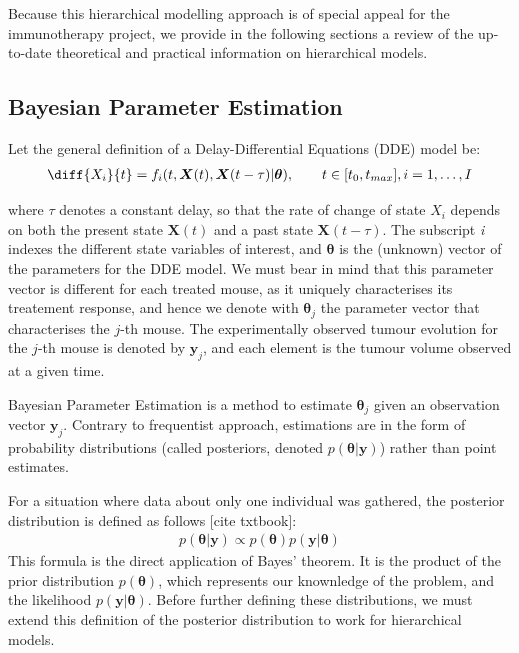 \documentclass[11pt]{article}
\begin{document}
Because this hierarchical modelling approach is of special appeal for the immunotherapy project, we provide in the following sections a review of the up-to-date theoretical and practical information on hierarchical models.

\subsection{Bayesian Parameter Estimation}
Let the general definition of a Delay-Differential Equations (DDE) model be: 
\begin{align*}
    \diff{X_i}{t} = f_i(t, \boldsymbol{X}(t), \boldsymbol{X}(t-\tau)| \boldsymbol{\theta}), \qquad t \in [t_0, t_{max}], i = 1, \ldots, I
\end{align*}

where $\tau$ denotes a constant delay, so that the rate of change of state $X_i$ depends on both the present state $\boldsymbol{X}(t)$ and a past state $\boldsymbol{X}(t-\tau)$. The subscript \textit{i} indexes the different state variables of interest, and $\boldsymbol{\theta}$ is the (unknown) vector of the parameters for the DDE model. We must bear in mind that this parameter vector is different for each treated mouse, as it uniquely characterises its treatement response, and hence we denote with $\boldsymbol{\theta}_j$ the parameter vector that characterises the $j$-th mouse. The experimentally observed tumour evolution for the $j$-th mouse is denoted by $\boldsymbol{y}_j$, and each element is the tumour volume observed at a given time.

Bayesian Parameter Estimation is a method to estimate $\boldsymbol{\theta}_j$ given an observation vector $\boldsymbol{y}_j$. Contrary to frequentist approach, estimations are in the form of probability distributions (called posteriors, denoted $p(\boldsymbol{\theta}|\boldsymbol{y})$) rather than point estimates. 

For a situation where data about only one individual was gathered, the posterior distribution is defined as follows [cite txtbook]:
\begin{align*}
    p(\boldsymbol{\theta} | \boldsymbol{y}) \propto p(\boldsymbol{\theta})p(\boldsymbol{y}|\boldsymbol{\theta})
\end{align*} 
This formula is the direct application of Bayes' theorem. It is the product of the prior distribution $p(\boldsymbol{\theta})$, which represents our knownledge of the problem, and the likelihood $p(\boldsymbol{y} | \boldsymbol{\theta})$. Before further defining these distributions, we must extend this definition of the posterior distribution to work for hierarchical models. 
\end{document}

